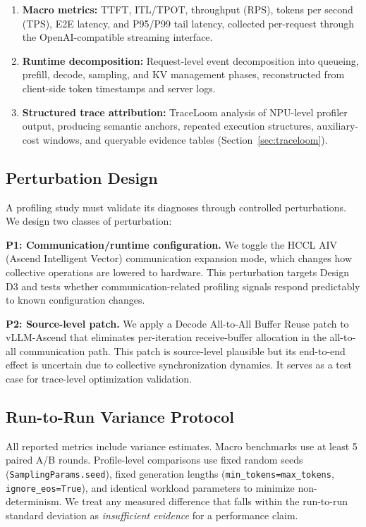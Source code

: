 \documentclass[conference]{IEEEtran}
\begin{document}
\begin{enumerate}
\item \textbf{Macro metrics:} TTFT, ITL/TPOT, throughput (RPS), tokens per
second (TPS), E2E latency, and P95/P99 tail latency, collected per-request
through the OpenAI-compatible streaming interface.

\item \textbf{Runtime decomposition:} Request-level event decomposition into
queueing, prefill, decode, sampling, and KV management phases, reconstructed
from client-side token timestamps and server logs.

\item \textbf{Structured trace attribution:} TraceLoom analysis of NPU-level
profiler output, producing semantic anchors, repeated execution structures,
auxiliary-cost windows, and queryable evidence tables
(Section~\ref{sec:traceloom}).
\end{enumerate}

\subsection{Perturbation Design}

A profiling study must validate its diagnoses through controlled perturbations.
We design two classes of perturbation:

\textbf{P1: Communication/runtime configuration.} We toggle the HCCL AIV
(Ascend Intelligent Vector) communication expansion mode, which changes how
collective operations are lowered to hardware. This perturbation targets
Design D3 and tests whether communication-related profiling signals respond
predictably to known configuration changes.

\textbf{P2: Source-level patch.} We apply a Decode All-to-All Buffer Reuse
patch to vLLM-Ascend that eliminates per-iteration receive-buffer allocation
in the all-to-all communication path. This patch is source-level plausible
but its end-to-end effect is uncertain due to collective synchronization
dynamics. It serves as a test case for trace-level optimization validation.

\subsection{Run-to-Run Variance Protocol}

All reported metrics include variance estimates. Macro benchmarks use at least
5 paired A/B rounds. Profile-level comparisons use fixed random seeds
(\texttt{SamplingParams.seed}), fixed generation lengths
(\texttt{min\_tokens=max\_tokens}, \texttt{ignore\_eos=True}), and identical
workload parameters to minimize non-determinism. We treat any measured
difference that falls within the run-to-run standard deviation as
\emph{insufficient evidence} for a performance claim.
\end{document}
